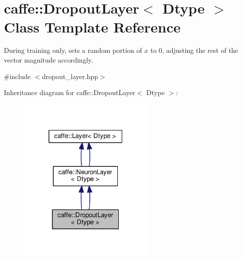 \hypertarget{classcaffe_1_1_dropout_layer}{}\section{caffe\+:\+:Dropout\+Layer$<$ Dtype $>$ Class Template Reference}
\label{classcaffe_1_1_dropout_layer}


During training only, sets a random portion of $x$ to 0, adjusting the rest of the vector magnitude accordingly.  




{\ttfamily \#include $<$dropout\+\_\+layer.\+hpp$>$}



Inheritance diagram for caffe\+:\+:Dropout\+Layer$<$ Dtype $>$\+:
\nopagebreak
\begin{figure}[H]
\begin{center}
\leavevmode
\includegraphics[width=193pt]{classcaffe_1_1_dropout_layer__inherit__graph}
\end{center}
\end{figure}
